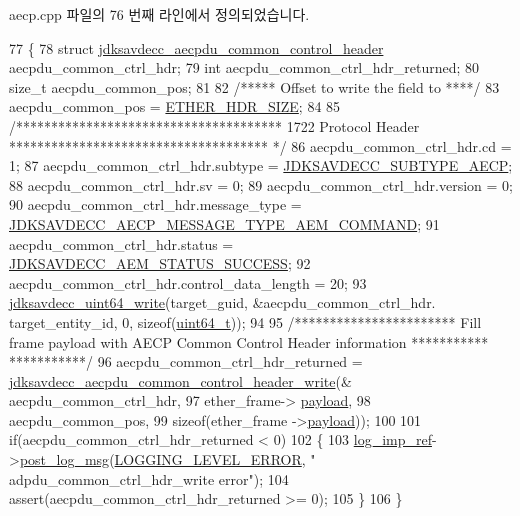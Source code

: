 aecp.\+cpp 파일의 76 번째 라인에서 정의되었습니다.


\begin{DoxyCode}
77     \{
78         \textcolor{keyword}{struct }\hyperlink{structjdksavdecc__aecpdu__common__control__header}{jdksavdecc\_aecpdu\_common\_control\_header} 
      aecpdu\_common\_ctrl\_hdr;
79         \textcolor{keywordtype}{int} aecpdu\_common\_ctrl\_hdr\_returned;
80         \textcolor{keywordtype}{size\_t} aecpdu\_common\_pos;
81 
82         \textcolor{comment}{/***** Offset to write the field to ****/}
83         aecpdu\_common\_pos = \hyperlink{namespaceavdecc__lib_a6c827b1a0d973e18119c5e3da518e65ca9512ad9b34302ba7048d88197e0a2dc0}{ETHER\_HDR\_SIZE};
84 
85         \textcolor{comment}{/************************************** 1722 Protocol Header *************************************
      */}
86         aecpdu\_common\_ctrl\_hdr.cd = 1;
87         aecpdu\_common\_ctrl\_hdr.subtype = \hyperlink{group__subtype_ga4f1d76227a738f442d15ebaf2253b6b3}{JDKSAVDECC\_SUBTYPE\_AECP};
88         aecpdu\_common\_ctrl\_hdr.sv = 0;
89         aecpdu\_common\_ctrl\_hdr.version = 0;
90         aecpdu\_common\_ctrl\_hdr.message\_type = 
      \hyperlink{group__aecp__message__type_ga4625ce189cc209f42deb0629f48faf69}{JDKSAVDECC\_AECP\_MESSAGE\_TYPE\_AEM\_COMMAND};
91         aecpdu\_common\_ctrl\_hdr.status = \hyperlink{group__aecpdu__aem__status_gaa4d43ea279e119485de1282522a7fb67}{JDKSAVDECC\_AEM\_STATUS\_SUCCESS};
92         aecpdu\_common\_ctrl\_hdr.control\_data\_length = 20;
93         \hyperlink{group__endian_gaa294fd85c2d887032dad294c6833c903}{jdksavdecc\_uint64\_write}(target\_guid, &aecpdu\_common\_ctrl\_hdr.
      target\_entity\_id, 0, \textcolor{keyword}{sizeof}(\hyperlink{parse_8c_aec6fcb673ff035718c238c8c9d544c47}{uint64\_t}));
94 
95         \textcolor{comment}{/*********************** Fill frame payload with AECP Common Control Header information ***********
      ***********/}
96         aecpdu\_common\_ctrl\_hdr\_returned = 
      \hyperlink{group__aecpdu_ga828eb506e6ecb72b56d72cd4e4fd433a}{jdksavdecc\_aecpdu\_common\_control\_header\_write}(&
      aecpdu\_common\_ctrl\_hdr,
97                                                                                         ether\_frame->
      \hyperlink{structjdksavdecc__frame_a220ad076814a31ae0163e722e523de46}{payload},
98                                                                                         aecpdu\_common\_pos,
99                                                                                         \textcolor{keyword}{sizeof}(ether\_frame
      ->\hyperlink{structjdksavdecc__frame_a220ad076814a31ae0163e722e523de46}{payload}));
100 
101         \textcolor{keywordflow}{if}(aecpdu\_common\_ctrl\_hdr\_returned < 0)
102         \{
103             \hyperlink{namespaceavdecc__lib_acbe3e2a96ae6524943ca532c87a28529}{log\_imp\_ref}->\hyperlink{classavdecc__lib_1_1log_a68139a6297697e4ccebf36ccfd02e44a}{post\_log\_msg}(\hyperlink{namespaceavdecc__lib_a501055c431e6872ef46f252ad13f85cdaf2c4481208273451a6f5c7bb9770ec8a}{LOGGING\_LEVEL\_ERROR}, \textcolor{stringliteral}{"
      adpdu\_common\_ctrl\_hdr\_write error"});
104             assert(aecpdu\_common\_ctrl\_hdr\_returned >= 0);
105         \}
106     \}
\end{DoxyCode}


